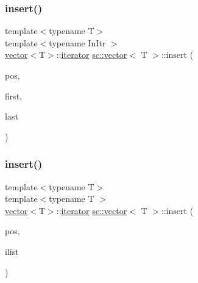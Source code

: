 \mbox{\label{classsc_1_1vector_a774a81ea7131584862592c29a8137e28}} 
\subsubsection{\texorpdfstring{insert()}{insert()}\hspace{0.1cm}{\footnotesize\ttfamily [7/9]}}
{\footnotesize\ttfamily template$<$typename T$>$ \\
template$<$typename In\+Itr $>$ \\
\mbox{\hyperlink{classsc_1_1vector}{vector}}$<$T$>$\+::\mbox{\hyperlink{classsc_1_1vector_1_1iterator}{iterator}} \mbox{\hyperlink{classsc_1_1vector}{sc\+::vector}}$<$ T $>$\+::insert (\begin{DoxyParamCaption}\item[{typename \mbox{\hyperlink{classsc_1_1vector}{vector}}$<$ T $>$\+::\mbox{\hyperlink{classsc_1_1vector_1_1iterator}{iterator}}}]{pos,  }\item[{In\+Itr}]{first,  }\item[{In\+Itr}]{last }\end{DoxyParamCaption})}

\mbox{\label{classsc_1_1vector_a4e59b7f5bc99a5436397426626719251}} 
\subsubsection{\texorpdfstring{insert()}{insert()}\hspace{0.1cm}{\footnotesize\ttfamily [8/9]}}
{\footnotesize\ttfamily template$<$typename T$>$ \\
template$<$typename T $>$ \\
\mbox{\hyperlink{classsc_1_1vector}{vector}}$<$T$>$\+::\mbox{\hyperlink{classsc_1_1vector_1_1iterator}{iterator}} \mbox{\hyperlink{classsc_1_1vector}{sc\+::vector}}$<$ T $>$\+::insert (\begin{DoxyParamCaption}\item[{typename \mbox{\hyperlink{classsc_1_1vector}{vector}}$<$ T $>$\+::\mbox{\hyperlink{classsc_1_1vector_1_1iterator}{iterator}}}]{pos,  }\item[{std\+::initializer\+\_\+list$<$ T $>$}]{ilist }\end{DoxyParamCaption})}

